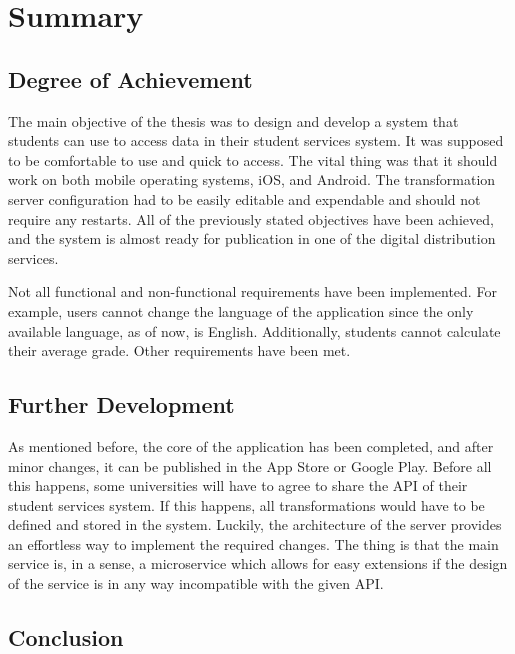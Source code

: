 \chapter{Summary}
\section{Degree of Achievement}
The main objective of the thesis was to design and develop a system that students can use to access data in their student services system. It was supposed to be comfortable to use and quick to access. The vital thing was that it should work on both mobile operating systems, iOS, and Android. The transformation server configuration had to be easily editable and expendable and should not require any restarts. All of the previously stated objectives have been achieved, and the system is almost ready for publication in one of the digital distribution services.

Not all functional and non-functional requirements have been implemented. For example, users cannot change the language of the application since the only available language, as of now, is English. Additionally, students cannot calculate their average grade. Other requirements have been met.

\section{Further Development}
As mentioned before, the core of the application has been completed, and after minor changes, it can be published in the App Store or Google Play. Before all this happens, some universities will have to agree to share the API of their student services system. If this happens, all transformations would have to be defined and stored in the system. Luckily, the architecture of the server provides an effortless way to implement the required changes. The thing is that the main service is, in a sense, a microservice which allows for easy extensions if the design of the service is in any way incompatible with the given API.

\section{Conclusion}
